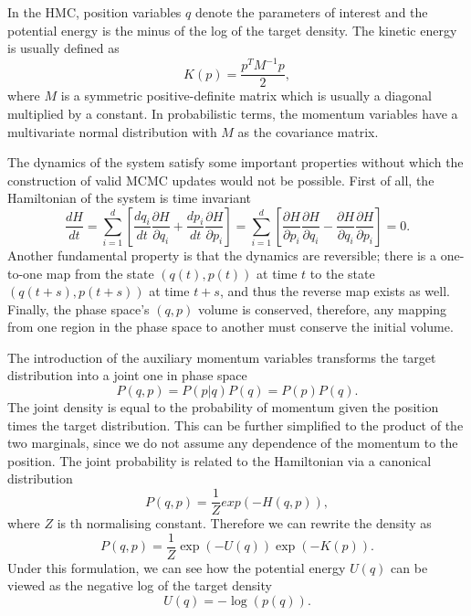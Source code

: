 In the HMC, position variables $q$ denote the parameters of interest and the potential energy is the minus of the log of the target density. The kinetic energy is usually defined as 
\begin{equation}
	K(p)= \frac{p^T M^{-1}p}{2},
\end{equation}
where $M$ is a symmetric positive-definite matrix which is usually a diagonal multiplied by a constant. In probabilistic terms, the momentum variables have a multivariate normal distribution with $M$ as the covariance matrix.



The dynamics of the system satisfy some important properties without which the construction of valid MCMC updates would not be possible. First of all, the Hamiltonian of the system is time invariant 
\begin{equation}
	\frac{d H}{d t}=\sum_{i=1}^{d}\left[\frac{d q_{i}}{d t} \frac{\partial H}{\partial q_{i}}+\frac{d p_{i}}{d t} \frac{\partial H}{\partial p_{i}}\right]=\sum_{i=1}^{d}\left[\frac{\partial H}{\partial p_{i}} \frac{\partial H}{\partial q_{i}}-\frac{\partial H}{\partial q_{i}} \frac{\partial H}{\partial p_{i}}\right]=0.
\end{equation}
Another fundamental property is that the dynamics are reversible; there is a one-to-one map from the state $(q(t),p(t))$ at time $t$ to the state $(q(t+s),p(t+s))$ at time $t+s$, and thus the reverse map exists as well.
Finally, the phase space's $(q,p)$ volume is conserved, therefore, any mapping from one region in the phase space to another must conserve the initial volume. 


The introduction of the auxiliary momentum variables transforms the target distribution into a joint one in phase space 
\begin{equation}
	P(q,p) = P(p|q)P(q) = P(p)P(q).
\end{equation}
The joint density is equal to the probability of momentum given the position times the target distribution. This can be further simplified to the product of the two marginals, since we do not assume any dependence of the momentum to the position. The joint probability is related to the Hamiltonian via a canonical distribution
\begin{equation}
	P(q,p) = \frac{1}{Z}exp\left(-H(q,p)\right),
\end{equation}
where $Z$ is th normalising constant. 
Therefore we can rewrite the density as 
\begin{equation}
	P(q, p)=\frac{1}{Z} \exp \left({-U(q)}\right) \exp \left({-K(p)}\right).
\end{equation}
Under this formulation, we can see how the potential energy $U(q)$ can be viewed as the negative log of the target density 
\begin{equation}
	U(q) = -\log(p(q)).
\end{equation}

